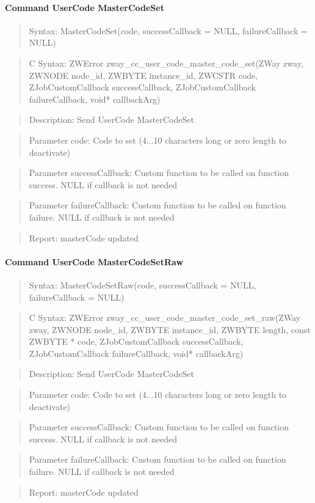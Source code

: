 \paragraph{Command UserCode MasterCodeSet}
\begin{quote}Syntax: MasterCodeSet(code, successCallback = NULL, failureCallback = NULL)\end{quote}
\begin{quote}C Syntax: ZWError zway\_cc\_user\_code\_master\_code\_set(ZWay zway, ZWNODE node\_id, ZWBYTE instance\_id, ZWCSTR code, ZJobCustomCallback successCallback, ZJobCustomCallback failureCallback, void* callbackArg)\end{quote}
\begin{quote}Description: Send UserCode MasterCodeSet\end{quote}
\begin{quote}Parameter code: Code to set (4...10 characters long or zero length to deactivate)\end{quote}
\begin{quote}Parameter successCallback: Custom function to be called on function success. NULL if callback is not needed\end{quote}
\begin{quote}Parameter failureCallback: Custom function to be called on function failure. NULL if callback is not needed\end{quote}
\begin{quote}Report: masterCode updated\end{quote}

\paragraph{Command UserCode MasterCodeSetRaw}
\begin{quote}Syntax: MasterCodeSetRaw(code, successCallback = NULL, failureCallback = NULL)\end{quote}
\begin{quote}C Syntax: ZWError zway\_cc\_user\_code\_master\_code\_set\_raw(ZWay zway, ZWNODE node\_id, ZWBYTE instance\_id, ZWBYTE length, const ZWBYTE * code, ZJobCustomCallback successCallback, ZJobCustomCallback failureCallback, void* callbackArg)\end{quote}
\begin{quote}Description: Send UserCode MasterCodeSet\end{quote}
\begin{quote}Parameter code: Code to set (4...10 characters long or zero length to deactivate)\end{quote}
\begin{quote}Parameter successCallback: Custom function to be called on function success. NULL if callback is not needed\end{quote}
\begin{quote}Parameter failureCallback: Custom function to be called on function failure. NULL if callback is not needed\end{quote}
\begin{quote}Report: masterCode updated\end{quote}

